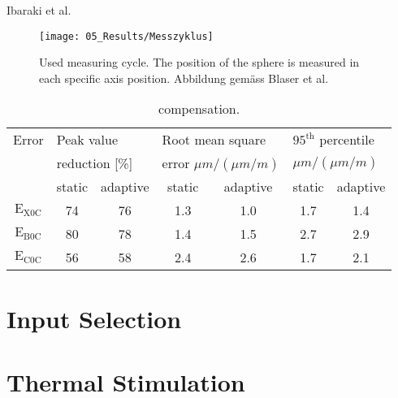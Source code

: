 Ibaraki et al. \cite{Ibaraki2011}

\begin{figure}[!htb]
    \centering
    \texttt{[image: 05\_Results/Messzyklus]} %
    \caption[Measuring cycle]{Used measuring cycle. The position of the sphere is measured in each specific axis position. Abbildung gemäss Blaser et al. \cite{Blaser_2017}}
    \label{fig:messzyklus.}
\end{figure}




\begin{table}[!htb]
\centering
\begin{threeparttable}
\caption[Statistical evaluation of the data and comparison of the methods - static vs. adaptive]{ compensation.}
\begin{tabular}{c c c c c c c}
\hline
Error  & \multicolumn{2}{l}{Peak value} \hspace{2cm} & \multicolumn{2}{l}{Root mean square} \hspace{2cm} & \multicolumn{2}{l}{$\mathrm{95^{th}}$ percentile} \vspace{-0.2cm} \\
 & \multicolumn{2}{l}{reduction [\%]} & \multicolumn{2}{l}{error $\mu m / (\mu m / m)$} & \multicolumn{2}{l}{$\mu m / (\mu m / m)$} \\
\hline
  & static & adaptive & static & adaptive & static & adaptive \\
  \hline \vspace{-0.2cm}
 $\mathrm{E_{X0C}}$ & 74 & 76 & 1.3 & 1.0 & 1.7 & 1.4 \\  \vspace{-0.2cm}
 $\mathrm{E_{B0C}}$ & 80 & 78 & 1.4 & 1.5 & 2.7 & 2.9 \\ 
 $\mathrm{E_{C0C}}$ & 56 & 58 & 2.4 & 2.6 & 1.7 & 2.1 \\
\hline
\end{tabular}
\label{Tab:statistic_GL}
\end{threeparttable}
\end{table}

\section{Input Selection}
\label{sec:Input_Selection}

\section{Thermal Stimulation}
\label{sec:thermal_stimulation_results}


\